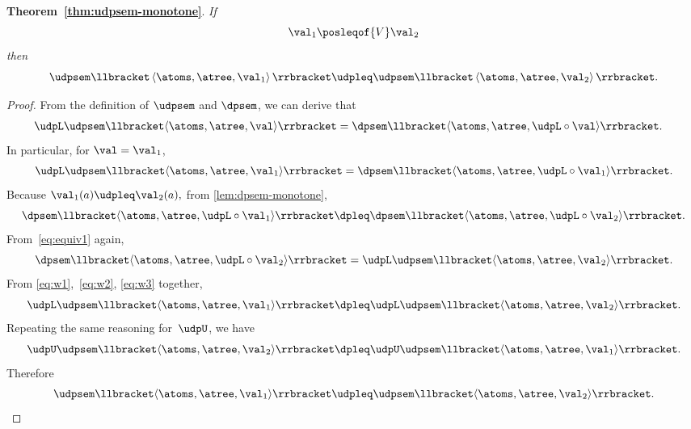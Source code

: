 \textbf{Theorem~\ref{thm:udpsem-monotone}}. \emph{If
    \[
        \val_{1}\posleqof{V}\val_{2}
    \]
    then
    \[
        \udpsem\llbracket\left\langle \atoms,\atree,\val_{1}\right\rangle \rrbracket\udpleq\udpsem\llbracket\left\langle \atoms,\atree,\val_{2}\right\rangle \rrbracket.
    \]
}
\begin{proof}
    From the definition of $\udpsem$ and $\dpsem$, we can derive that
    \begin{align}
        \udpL\udpsem\llbracket\langle\atoms,\atree,\val\rangle\rrbracket & =\dpsem\llbracket\langle\atoms,\atree,\udpL\circ\val\rangle\rrbracket.
        \label{eq:equiv1}
    \end{align}
    In particular, for $\val=\val_{1}$,
    \begin{equation}
        \udpL\udpsem\llbracket\langle\atoms,\atree,\val_{1}\rangle\rrbracket=\dpsem\llbracket\langle\atoms,\atree,\udpL\circ\val_{1}\rangle\rrbracket.
        \label{eq:w1}
    \end{equation}
    Because $\val_{1}(a)\udpleq\val_{2}(a),$ from \cref{lem:dpsem-monotone},
    \begin{equation}
        \dpsem\llbracket\langle\atoms,\atree,\udpL\circ\val_{1}\rangle\rrbracket\dpleq\dpsem\llbracket\langle\atoms,\atree,\udpL\circ\val_{2}\rangle\rrbracket.
        \label{eq:w2}
    \end{equation}
    From~\cref{eq:equiv1} again,
    \begin{equation}
        \dpsem\llbracket\langle\atoms,\atree,\udpL\circ\val_{2}\rangle\rrbracket=\udpL\udpsem\llbracket\langle\atoms,\atree,\val_{2}\rangle\rrbracket.
        \label{eq:w3}
    \end{equation}
    From \cref{eq:w1},~\cref{eq:w2}, \cref{eq:w3} together,
    \[
        \udpL\udpsem\llbracket\langle\atoms,\atree,\val_{1}\rangle\rrbracket\dpleq\udpL\udpsem\llbracket\langle\atoms,\atree,\val_{2}\rangle\rrbracket.
    \]
    Repeating the same reasoning for~$\udpU$, we have
    \[
        \udpU\udpsem\llbracket\langle\atoms,\atree,\val_{2}\rangle\rrbracket\dpleq\udpU\udpsem\llbracket\langle\atoms,\atree,\val_{1}\rangle\rrbracket.
    \]
    Therefore
    \[
        \udpsem\llbracket\langle\atoms,\atree,\val_{1}\rangle\rrbracket\udpleq\udpsem\llbracket\langle\atoms,\atree,\val_{2}\rangle\rrbracket.
    \]
\end{proof}

\vfill\pagebreak

